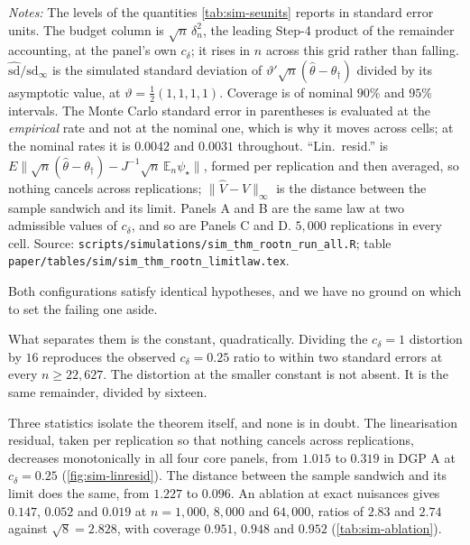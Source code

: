 \documentclass[
  12pt]{article}
\newcommand{\1}[1]{\mathds{1}\left[#1\right]}
\theoremstyle{plain}
\theoremstyle{definition}
\theoremstyle{definition}
\theoremstyle{remark}
\begin{document}
\begin{table}[!htbp]
\begin{threeparttable}
\setlength{\tabcolsep}{4pt}

\begin{tablenotes}\footnotesize
\item \textit{Notes:} The levels of the quantities \cref{tab:sim-seunits} reports
in standard error units. The budget column is $\sqrt n\,\delta_n^{2}$, the
leading Step-4 product of the remainder accounting, at the panel's own
$c_\delta$; it rises in $n$ across this grid rather than falling.
$\hat{\mathrm{sd}}/\mathrm{sd}_\infty$ is the simulated standard deviation of
$\vartheta'\sqrt n(\hat\theta-\theta_\dagger)$ divided by its asymptotic value,
at $\vartheta=\tfrac12(1,1,1,1)$. Coverage is of nominal $90\%$ and $95\%$
intervals. The Monte Carlo standard error in parentheses is evaluated at the
\emph{empirical} rate and not at the nominal one, which is why it moves across
cells; at the nominal rates it is $0.0042$ and $0.0031$ throughout. ``Lin.\
resid.'' is
$E\|\sqrt n(\hat\theta-\theta_\dagger)-J^{-1}\sqrt n\,\mathbb E_n\psi_\star\|$,
formed per replication and then averaged, so nothing cancels across
replications; $\|\hat V-V\|_\infty$ is the distance between the sample sandwich
and its limit. Panels A and B are the same law at two admissible values of
$c_\delta$, and so are Panels C and D. $5{,}000$ replications in every cell.
Source: \texttt{scripts/simulations/sim\_thm\_rootn\_run\_all.R}; table
\texttt{paper/tables/sim/sim\_thm\_rootn\_limitlaw.tex}.
\end{tablenotes}
\end{threeparttable}
\end{table}

Both configurations satisfy identical hypotheses, and we have no ground on which
to set the failing one aside.

What separates them is the constant, quadratically. Dividing the $c_\delta=1$
distortion by $16$ reproduces the observed $c_\delta=0.25$ ratio to within two
standard errors at every $n\ge22{,}627$. The distortion at the smaller constant is
not absent. It is the same remainder, divided by sixteen.

Three statistics isolate the theorem itself, and none is in doubt. The
linearisation residual, taken per replication so that nothing cancels across
replications, decreases monotonically in all four core panels, from $1.015$ to
$0.319$ in DGP A at $c_\delta=0.25$ (\cref{fig:sim-linresid}). The distance
between the sample sandwich and its limit does the same, from $1.227$ to $0.096$.
An ablation at exact nuisances gives $0.147$, $0.052$ and $0.019$ at
$n=1{,}000$, $8{,}000$ and $64{,}000$, ratios of $2.83$ and $2.74$ against
$\sqrt8=2.828$, with coverage $0.951$, $0.948$ and $0.952$
(\cref{tab:sim-ablation}).
\end{document}
